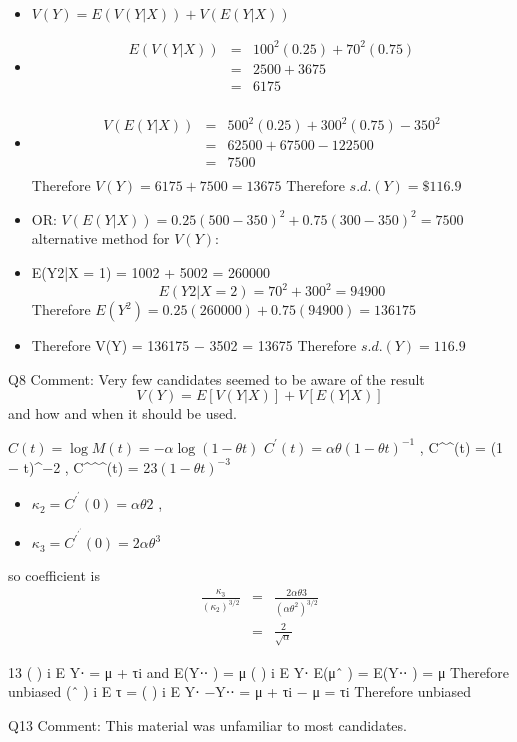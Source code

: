 \documentclass[a4paper,12pt]{article}
\begin{document}
\begin{itemize}
    \item $V(Y) = E(V(Y|X)) + V(E(Y|X))$
\item \begin{eqnarray*}
E(V(Y|X)) &=& 100^2(0.25) + 70^2(0.75)\\
&=& 2500 + 3675\\ &=& 6175\\
\end{eqnarray*}
\item \begin{eqnarray*}V(E(Y|X)) &=& 500^2(0.25) + 300^2(0.75) − 350^2\\
&=& 62500 + 67500 − 122500 \\ &=& 7500\\
\end{eqnarray*}
Therefore $V(Y) = 6175 + 7500 = 13675$
Therefore $s.d.(Y) = \$116.9$
\item OR: $V(E(Y|X)) = 0.25(500 − 350)^2 + 0.75(300 − 350)^2 = 7500$
alternative method for $V(Y)$:
\item E(Y2|X = 1) = 1002 + 5002 = 260000
\[E(Y2|X=2) = 70^2 + 300^2 = 94900\]
Therefore $E(Y^2) = 0.25(260000) + 0.75(94900)
= 136175$
\item Therefore V(Y) = 136175 − 3502 = 13675
Therefore $s.d.(Y) = 116.9$
\end{itemize}

Q8 Comment: Very few candidates seemed to be aware of the result \[V(Y) = E[V(Y|X)]
+ V[E(Y|X)] \]and how and when it should be used.



$C(t) = \log M(t) = −\alpha \log(1− \theta t)$
$C^{\prime}(t) = \alpha\theta (1 − \theta t)^{−1}$ , 
C^{\prime}^{\prime}(t) = \alpha{}(1 − \theta t)^{−2} , C^{\prime}^{\prime}^{\prime}(t) = 2\alpha\theta $3(1 − \theta t)^{−3}$

\begin{itemize}
\item $\kappa_2 = C^{\prime}^{\prime}(0) = \alpha\theta 2$ , 
\item $\kappa_3 = C^{\prime}^{\prime}^{\prime}(0) = 2\alpha\theta^3$ 
\end{itemize}

so coefficient is
\begin{eqnarray*}
\frac{\kappa_3 }{ (\kappa_2)^{3/2} } &=& \frac{2\alpha\theta 3 }{ (\alpha\theta^2)^{3/2} }\\ 
&=& \frac{2}{\sqrt{\alpha}}
\end{eqnarray*}

\newpage

13 ( ) i E Y⋅ = μ + τi and E(Y⋅⋅ ) = μ
( ) i E Y⋅ E(μˆ ) = E(Y⋅⋅ ) = μ Therefore unbiased
(ˆ ) i E τ = ( ) i E Y⋅ −Y⋅⋅ = μ + τi − μ = τi Therefore unbiased

Q13 Comment: This material was unfamiliar to most candidates.
\end{document}

